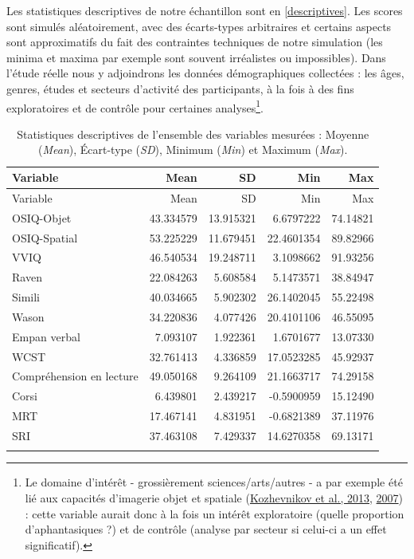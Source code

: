 \documentclass[
  12pt,
]{article}
\begin{document}
Les statistiques descriptives de notre échantillon sont en
\autoref{descriptives}. Les scores sont simulés aléatoirement, avec des
écarts-types arbitraires et certains aspects sont approximatifs du fait
des contraintes techniques de notre simulation (les minima et maxima par
exemple sont souvent irréalistes ou impossibles). Dans l'étude réelle
nous y adjoindrons les données démographiques collectées : les âges,
genres, études et secteurs d'activité des participants, à la fois à des
fins exploratoires et de contrôle pour certaines analyses\footnote{Le
  domaine d'intérêt - grossièrement sciences/arts/autres - a par exemple
  été lié aux capacités d'imagerie objet et spatiale
  (\protect\hyperlink{ref-kozhevnikovCreativityVisualizationAbilities2013}{Kozhevnikov
  et al., 2013},
  \protect\hyperlink{ref-kozhevnikovSpatialVisualizationPhysics2007}{2007})
  : cette variable aurait donc à la fois un intérêt exploratoire (quelle
  proportion d'aphantasiques ?) et de contrôle (analyse par secteur si
  celui-ci a un effet significatif).}.

\begin{longtable}[]{@{}lrrrr@{}}
\toprule()
Variable & Mean & SD & Min & Max \\
\midrule()
\endfirsthead
\toprule()
Variable & Mean & SD & Min & Max \\
\midrule()
\endhead
OSIQ-Objet & 43.334579 & 13.915321 & 6.6797222 & 74.14821 \\
OSIQ-Spatial & 53.225229 & 11.679451 & 22.4601354 & 89.82966 \\
VVIQ & 46.540534 & 19.248711 & 3.1098662 & 91.93256 \\
Raven & 22.084263 & 5.608584 & 5.1473571 & 38.84947 \\
Simili & 40.034665 & 5.902302 & 26.1402045 & 55.22498 \\
Wason & 34.220836 & 4.077426 & 20.4101106 & 46.55095 \\
Empan verbal & 7.093107 & 1.922361 & 1.6701677 & 13.07330 \\
WCST & 32.761413 & 4.336859 & 17.0523285 & 45.92937 \\
Compréhension en lecture & 49.050168 & 9.264109 & 21.1663717 &
74.29158 \\
Corsi & 6.439801 & 2.439217 & -0.5900959 & 15.12490 \\
MRT & 17.467141 & 4.831951 & -0.6821389 & 37.11976 \\
SRI & 37.463108 & 7.429337 & 14.6270358 & 69.13171 \\
\bottomrule()
\caption{Statistiques descriptives de l'ensemble des variables mesurées
: Moyenne (\emph{Mean}), Écart-type (\emph{SD}), Minimum (\emph{Min}) et
Maximum (\emph{Max}).\label{descriptives}}\tabularnewline
\end{longtable}
\end{document}
